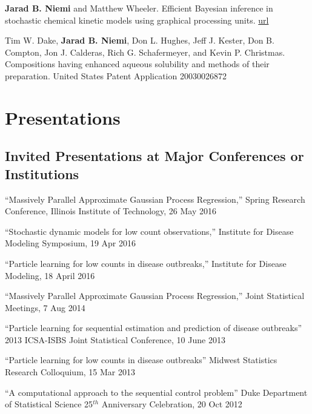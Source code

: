 \documentclass[overlapped,line]{res}
\begin{document}
\begin{resume}
{\bf Jarad B. Niemi} and Matthew Wheeler. Efficient Bayesian inference in stochastic chemical kinetic models using graphical processing units. \href{http://arxiv.org/abs/1101.4242}{url}

Tim W. Dake, {\bf Jarad B. Niemi}, Don L. Hughes, Jeff J. Kester, Don B. Compton, Jon J. Calderas, Rich G. Schafermeyer, and Kevin P. Christmas. Compositions having enhanced aqueous solubility and methods of their preparation. United States Patent Application 20030026872 %



\section{\bf Presentations}

\vspace{-0.2in}

\subsection{\bf Invited Presentations at Major Conferences or Institutions} \vspace{-0.2in}

{\small

``Massively Parallel Approximate Gaussian Process Regression,'' Spring Research Conference, Illinois Institute of Technology, 26 May 2016 

``Stochastic dynamic models for low count observations,'' Institute for Disease Modeling Symposium, 19 Apr 2016

``Particle learning for low counts in disease outbreaks,'' Institute for Disease Modeling, 18 April 2016

``Massively Parallel Approximate Gaussian Process Regression,'' Joint Statistical Meetings, 7 Aug 2014 

``Particle learning for sequential estimation and prediction of disease outbreaks''  2013 ICSA-ISBS Joint Statistical Conference, 10 June 2013 

``Particle learning for low counts in disease outbreaks'' Midwest Statistics Research Colloquium, 15 Mar 2013 

``A computational approach to the sequential control problem'' Duke Department of Statistical Science 25$^{th}$ Anniversary Celebration, 20 Oct 2012 

}
\end{resume}
\end{document}
